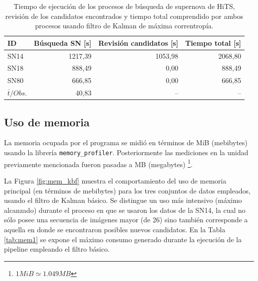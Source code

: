 \begin{table}[h!]
\centering
\caption{Tiempo de ejecuci\'on de los procesos de b\'usqueda de supernova de HiTS, revisi\'on de los candidatos encontrados y tiempo total comprendido por ambos procesos usando filtro de Kalman de m\'axima correntrop\'ia.}
\begin{tabular}{|l|r|r|r|}
\hline
\textbf{ID} & \textbf{B\'usqueda SN [s]} & \textbf{Revisi\'on candidatos [s]} & \textbf{Tiempo total [s]} \\ \hline
\hline
SN14 & 1217,39 & 1053,98 & 2068,80\\\hline
SN18 & 888,49 & 0,00 & 888,49\\\hline
SN80 & 666,85 & 0,00& 666,85\\\hline \hline
 $\bar{t}/Obs. $& 40,83 & -- & --\\\hline 
\end{tabular}
\label{tab:t6}
\end{table}

\subsection{Uso de memoria}

La memoria ocupada por el programa se midi\'o en t\'erminos de MiB (mebibytes) usando la librer\'ia \texttt{memory\_profiler}. Posteriormente las mediciones en la unidad previamente mencionada fueron pasadas a MB (megabytes) \footnote{$1MiB\simeq 1.049MB$ }.
\bigskip

La Figura \ref{fig:mem_kbf} muestra el comportamiento del uso de memoria principal (en t\'erminos de mebibytes) para los tres conjuntos de datos empleados, usando el filtro de Kalman b\'asico. Se distingue un uso m\'as intensivo (m\'aximo alcanzado) durante el proceso en que se usaron los datos de la SN14, la cual no s\'olo posee una secuencia de im\'agenes mayor (de 26) sino tambi\'en corresponde a aquella en donde se encontraron posibles nuevos candidatos. En la Tabla \ref{tab:mem1} se expone el m\'aximo consumo generado durante la ejecuci\'on de la pipeline empleando el filtro b\'asico.
\bigskip

